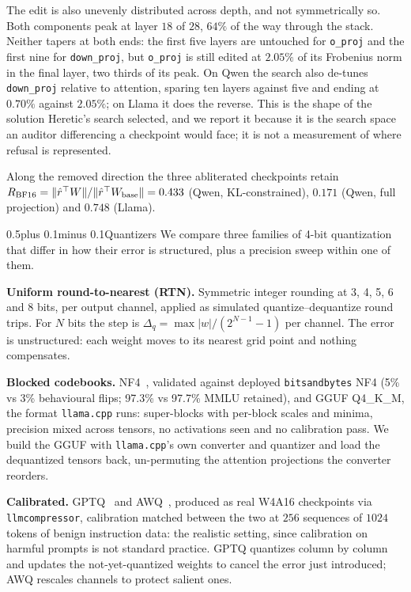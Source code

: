 \documentclass[conference,compsoc,letterpaper]{IEEEtran}
\makeatletter
\def\subsection{\@startsection{subsection}{2}{\z@}{1\baselineskip plus 0.25\baselineskip minus 0.25\baselineskip}%
{0.5\baselineskip plus 0.1\baselineskip minus 0.1\baselineskip}{\normalfont\sublargesize\bfseries}}%
\makeatother
\begin{document}
The edit is also unevenly distributed across depth, and not symmetrically so. Both components peak at layer $18$ of $28$, $64\%$ of the way through the stack. Neither tapers at both ends: the first five layers are untouched for \texttt{o\_proj} and the first nine for \texttt{down\_proj}, but \texttt{o\_proj} is still edited at $2.05\%$ of its Frobenius norm in the final layer, two thirds of its peak. On Qwen the search also de-tunes \texttt{down\_proj} relative to attention, sparing ten layers against five and ending at $0.70\%$ against $2.05\%$; on Llama it does the reverse. This is the shape of the solution Heretic's search selected, and we report it because it is the search space an auditor differencing a checkpoint would face; it is not a measurement of where refusal is represented.

Along the removed direction the three abliterated checkpoints retain $R_{\rm BF16} = \|\hat{r}^{\top}W\|/\|\hat{r}^{\top}W_{\rm base}\| = 0.433$ (Qwen, KL-constrained), $0.171$ (Qwen, full projection) and $0.748$ (Llama).

\subsection{Quantizers} \label{sec:quantizers} We compare three families of 4-bit quantization that differ in how their error is structured, plus a precision sweep within one of them.

\textbf{Uniform round-to-nearest (RTN).} Symmetric integer rounding at 3, 4, 5, 6 and 8 bits, per output channel, applied as simulated quantize--dequantize round trips. For $N$ bits the step is $\Delta_q = \max|w| / (2^{N-1}-1)$ per channel. The error is unstructured: each weight moves to its nearest grid point and nothing compensates.

\textbf{Blocked codebooks.} NF4~\cite{qlora2023}, validated against deployed \texttt{bitsandbytes} NF4 (5\% vs 3\% behavioural flips; 97.3\% vs 97.7\% MMLU retained), and GGUF Q4\_K\_M, the format \texttt{llama.cpp} runs: super-blocks with per-block scales and minima, precision mixed across tensors, no activations seen and no calibration pass. We build the GGUF with \texttt{llama.cpp}'s own converter and quantizer and load the dequantized tensors back, un-permuting the attention projections the converter reorders.

\textbf{Calibrated.} GPTQ~\cite{gptq2022} and AWQ~\cite{awq2023}, produced as real W4A16 checkpoints via \texttt{llmcompressor}, calibration matched between the two at $256$ sequences of $1024$ tokens of benign instruction data: the realistic setting, since calibration on harmful prompts is not standard practice. GPTQ quantizes column by column and updates the not-yet-quantized weights to cancel the error just introduced; AWQ rescales channels to protect salient ones.
\end{document}
